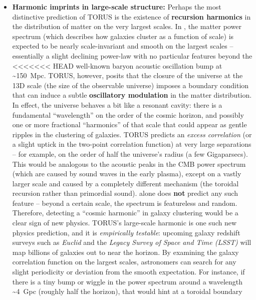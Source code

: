 \documentclass[]{article}
\begin{document}
\begin{itemize}
\item
  \textbf{Harmonic imprints in large-scale structure:} Perhaps the most
  distinctive prediction of TORUS is the existence of \textbf{recursion
  harmonics} in the distribution of matter on the very largest scales.
  In , the matter power spectrum (which describes how galaxies
  cluster as a function of scale) is expected to be nearly
  scale-invariant and smooth on the largest scales -- essentially a
  slight declining power-law with no particular features beyond the
<<<<<<< HEAD
  well-known baryon acoustic oscillation bump at \textasciitilde150~Mpc.
  TORUS, however, posits that the closure of the universe at the 13D
  scale (the size of the observable universe) imposes a boundary
  condition that can induce a subtle \textbf{oscillatory modulation} in
  the matter distribution\hspace{0pt}. In effect, the universe behaves a
  bit like a resonant cavity: there is a fundamental ``wavelength'' on
  the order of the cosmic horizon, and possibly one or more fractional
  ``harmonics'' of that scale that could appear as gentle ripples in the
  clustering of galaxies. TORUS predicts an \emph{excess correlation}
  (or a slight uptick in the two-point correlation function) at very
  large separations -- for example, on the order of half the universe's
  radius (a few Gigaparsecs)\hspace{0pt}. This would be analogous to the
  acoustic peaks in the CMB power spectrum (which are caused by sound
  waves in the early plasma), except on a vastly larger scale and caused
  by a completely different mechanism (the toroidal recursion rather
  than primordial sound).  alone does \textbf{not} predict any such
  feature -- beyond a certain scale, the  spectrum is featureless
  and random. Therefore, detecting a ``cosmic harmonic'' in galaxy
  clustering would be a clear sign of new physics. TORUS's large-scale
  harmonic is one such new physics prediction, and it is
  \emph{empirically testable}: upcoming galaxy redshift surveys such as
  \emph{Euclid} and the \emph{Legacy Survey of Space and Time (LSST)}
  will map billions of galaxies out to near the horizon. By examining
  the galaxy correlation function on the largest scales, astronomers can
  search for any slight periodicity or deviation from the smooth 
  expectation\hspace{0pt}. For instance, if there is a tiny bump or
  wiggle in the power spectrum around a wavelength \textasciitilde4~Gpc
  (roughly half the horizon), that would hint at a toroidal boundary

\end{itemize}
\end{document}
